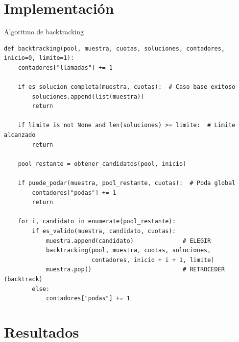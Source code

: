 \documentclass[aspectratio=169, 10pt]{beamer}
\begin{document}
\section{Implementación}

\begin{frame}[fragile]{Algoritmo de backtracking}
  \lstset{style=python}
  \begin{lstlisting}
def backtracking(pool, muestra, cuotas, soluciones, contadores, inicio=0, limite=1):
    contadores["llamadas"] += 1

    if es_solucion_completa(muestra, cuotas):  # Caso base exitoso
        soluciones.append(list(muestra))
        return

    if limite is not None and len(soluciones) >= limite:  # Limite alcanzado
        return

    pool_restante = obtener_candidatos(pool, inicio)

    if puede_podar(muestra, pool_restante, cuotas):  # Poda global
        contadores["podas"] += 1
        return

    for i, candidato in enumerate(pool_restante):
        if es_valido(muestra, candidato, cuotas):
            muestra.append(candidato)              # ELEGIR
            backtracking(pool, muestra, cuotas, soluciones,
                         contadores, inicio + i + 1, limite)
            muestra.pop()                          # RETROCEDER (backtrack)
        else:
            contadores["podas"] += 1
  \end{lstlisting}
\end{frame}


\section{Resultados}
\end{document}
